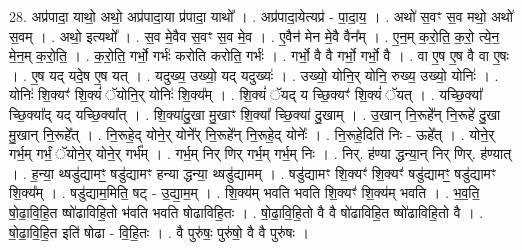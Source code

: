 \documentclass[17pt]{extarticle}
\begin{document}
28. अप्र॑पादा॒ याथो॒ अथो॒ अप्र॑पादा॒या प्र॑पादा॒ याथो᳚ । . अप्र॑पादा॒येत्यप्र॑ - पा॒दा॒य॒ । . अथो॑ स॒वꣳ स॒व मथो॒ अथो॑ स॒वम् । . अथो॒ इत्यथो᳚ । . स॒व मे॒वैव स॒वꣳ स॒व मे॒व । . ए॒वैन॑ मेन मे॒वै वैन᳚म् । . ए॒न॒म् क॒रो॒ति॒ क॒रो॒ त्ये॒न॒ मे॒न॒म् क॒रो॒ति॒ । . क॒रो॒ति॒ गर्भो॒ गर्भः॑ करोति करोति॒ गर्भः॑ । . गर्भो॒ वै वै गर्भो॒ गर्भो॒ वै । . वा ए॒ष ए॒ष वै वा ए॒षः । . ए॒ष यद् यदे॒ष ए॒ष यत् । . यदुख्य॒ उख्यो॒ यद् यदुख्यः॑ । . उख्यो॒ योनि॒र् योनि॒ रुख्य॒ उख्यो॒ योनिः॑ । . योनिः॑ शि॒क्यꣳ॑ शि॒क्यं॑ ॅयोनि॒र् योनिः॑ शि॒क्य᳚म् । . शि॒क्यं॑ ॅयद् य च्छि॒क्यꣳ॑ शि॒क्यं॑ ॅयत् । . यच्छि॒क्या᳚ च्छि॒क्या᳚द् यद् यच्छि॒क्या᳚त् । . शि॒क्या॑दु॒खा मु॒खाꣳ शि॒क्या᳚ च्छि॒क्या॑ दु॒खाम् । . उ॒खान् नि॒रूहे᳚न् नि॒रूहे॑ दु॒खा मु॒खान् नि॒रूहे᳚त् । . नि॒रूहे॒द् योने॒र् योने᳚र् नि॒रूहे᳚न् नि॒रूहे॒द् योनेः᳚ । . नि॒रूहे॒दिति॑ निः - ऊहे᳚त् । . योने॒र् गर्भ॒म् गर्भं॒ ॅयोने॒र् योने॒र् गर्भ᳚म् । . गर्भ॒म् निर् णिर् गर्भ॒म् गर्भ॒म् निः । . निर्. ह॑ण्या द्धन्या॒न् निर् णिर्. ह॑ण्यात् । . ह॒न्या॒ थ्षडु॑द्यामꣳ॒॒ षडु॑द्यामꣳ हन्या द्धन्या॒ थ्षडु॑द्यामम् । . षडु॑द्यामꣳ शि॒क्यꣳ॑ शि॒क्यꣳ॑ षडु॑द्यामꣳ॒॒ षडु॑द्यामꣳ शि॒क्य᳚म् । . षडु॑द्याम॒मिति॒ षट् - उ॒द्या॒म॒म् । . शि॒क्य॑म् भवति भवति शि॒क्यꣳ॑ शि॒क्य॑म् भवति । . भ॒व॒ति॒ षो॒ढा॒वि॒हि॒त ष्षो॑ढाविहि॒तो भ॑वति भवति षोढाविहि॒तः । . षो॒ढा॒वि॒हि॒तो वै वै षो॑ढाविहि॒त ष्षो॑ढाविहि॒तो वै । . षो॒ढा॒वि॒हि॒त इति॑ षोढा - वि॒हि॒तः । . वै पुरु॑षः॒ पुरु॑षो॒ वै वै पुरु॑षः । \newline
\end{document}
